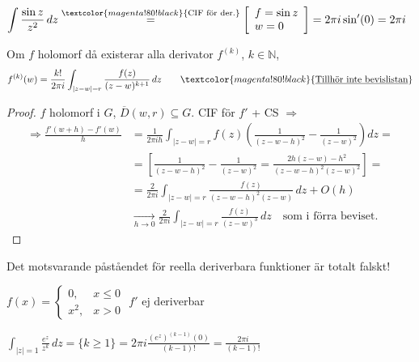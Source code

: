 \begin{example}
$\displaystyle\int \frac{\sin z}{z^2}\,dz \overset{\textcolor{magenta!80!black}{\text{CIF för der.}}}{=} \left[ \begin{array}{l} f = \sin z \\ w = 0 \end{array} \right] = 2\pi i \sin'(0) = 2\pi i$
\end{example}

\begin{theorem}[Korollorium]
Om $f$ holomorf då existerar alla derivator $f^{(k)}$, $k \in \mathbb{N}$,
\[ f^{(k)}(w) = \frac{k!}{2\pi i} \int_{|z - w| = r} \frac{f(z)}{(z - w)^{k+1}}\,dz \qquad \textcolor{magenta!80!black}{\text{\underline{Tillhör inte bevislistan}}} \]
\end{theorem}
\begin{proof}
$f$ holomorf i $G$, $\overline{D}(w, r) \subseteq G$. CIF för $f'$ + CS $\Rightarrow$
\begin{align*}
  \Rightarrow \frac{f'(w + h) - f'(w)}{h} &= \frac{1}{2\pi i h} \int_{|z - w| = r} f(z)\left( \frac{1}{(z - w - h)^2} - \frac{1}{(z - w)^2} \right) dz = \\
  &= \left[ \frac{1}{(z - w - h)^2} - \frac{1}{(z - w)^2} = \frac{2h(z - w) - h^2}{(z - w - h)^2(z - w)^2} \right] = \\
  &= \frac{2}{2\pi i} \int_{|z - w| = r} \frac{f(z)}{(z - w - h)^2(z - w)}\,dz + O(h) \\
  &\xrightarrow[h \to 0]{} \frac{2}{2\pi i} \int_{|z - w| = r} \frac{f(z)}{(z - w)^3}\,dz \quad \text{som i förra beviset.}
\end{align*}
\end{proof}

\begin{note}
Det motsvarande påståendet för reella deriverbara funktioner är totalt falskt!
\end{note}

\begin{example}
$f(x) = \begin{cases} 0, & x \le 0 \\ x^2, & x > 0 \end{cases}$
$f'$ ej deriverbar
\end{example}

\begin{example}
$\displaystyle\int_{|z| = 1} \frac{e^z}{z^k}\,dz = \{k \ge 1\} = 2\pi i \frac{(e^z)^{(k-1)}(0)}{(k - 1)!} = \frac{2\pi i}{(k - 1)!}$
\end{example}
